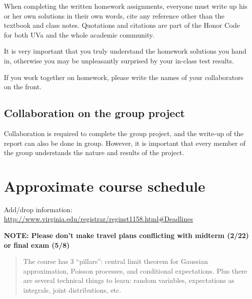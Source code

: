 \documentclass[oneside,11pt]{amsart}
\begin{document}
When completing the written homework assignments, everyone must write up his or her own
solutions in their own words, cite any reference other than the textbook and
class notes. Quotations and citations are part of the Honor Code for both UVa
and the whole academic community. 

It is very important that you truly understand the homework solutions you hand
in, otherwise you may be unpleasantly surprised by your in-class test results.

If you work together on homework, please write the names of your collaborators
on the front.

\subsection{Collaboration on the group project}

Collaboration is required to complete the group project,
and the write-up of the report can also be done in group. 
However, it is important that every member of the group understands the 
nature and results of the project.

\section{Approximate course schedule}

\noindent Add/drop information: \url{http://www.virginia.edu/registrar/reginst1158.html#Deadlines}
\smallskip

\noindent \textbf{NOTE: Please don't make travel plans conflicting with midterm (2/22) or final exam (5/8)}

\bigskip

\begin{quote}
	The course has 3 ``pillars'': central limit theorem for Gaussian approximation, 
	Poisson processes, and conditional expectations. 
	Plus there are several technical things to learn: random variables, expectations as integrals, 
	joint distributions, etc.
\end{quote}

\bigskip
\end{document}
